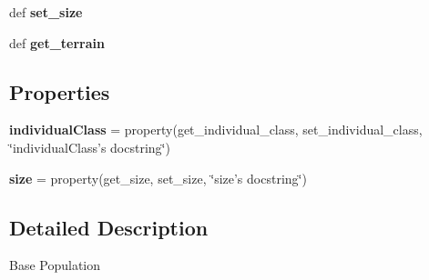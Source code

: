 \begin{DoxyCompactItemize}
\item 
\hypertarget{classsrc_1_1common__entities_1_1population_1_1Population_ac0c43ecc4c6af521d2b7ae9dd1027291}{
def {\bfseries set\_\-size}}
\label{classsrc_1_1common__entities_1_1population_1_1Population_ac0c43ecc4c6af521d2b7ae9dd1027291}

\item 
\hypertarget{classsrc_1_1common__entities_1_1population_1_1Population_a7a6cb671b4ca94e7a0b149ee39841a9a}{
def {\bfseries get\_\-terrain}}
\label{classsrc_1_1common__entities_1_1population_1_1Population_a7a6cb671b4ca94e7a0b149ee39841a9a}

\end{DoxyCompactItemize}
\subsection*{Properties}
\begin{DoxyCompactItemize}
\item 
\hypertarget{classsrc_1_1common__entities_1_1population_1_1Population_a6533dd09af0f2ecd2c3768777b366154}{
{\bfseries individualClass} = property(get\_\-individual\_\-class, set\_\-individual\_\-class, \char`\"{}individualClass's docstring\char`\"{})}
\label{classsrc_1_1common__entities_1_1population_1_1Population_a6533dd09af0f2ecd2c3768777b366154}

\item 
\hypertarget{classsrc_1_1common__entities_1_1population_1_1Population_ab11e5bbeb3253dcf0e171ec8c0380e17}{
{\bfseries size} = property(get\_\-size, set\_\-size, \char`\"{}size's docstring\char`\"{})}
\label{classsrc_1_1common__entities_1_1population_1_1Population_ab11e5bbeb3253dcf0e171ec8c0380e17}

\end{DoxyCompactItemize}


\subsection{Detailed Description}
\begin{DoxyVerb}
Base Population
\end{DoxyVerb}
 

